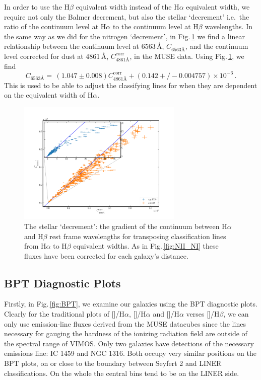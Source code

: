 		In order to use the H$\beta$ equivalent width instead of the H$\alpha$ equivalent width, we require not only the Balmer decrement, but also the stellar `decrement' i.e.\ the ratio of the continuum level at H$\alpha$ to the continuum level at H$\beta$ wavelengths. In the same way as we did for the nitrogen `decrement', in Fig.\,\ref{fig:stellarDec} we find a linear relationship between the continuum level at 6563\,\AA, $C_\text{6563\AA}$, and the continuum level corrected for dust at 4861\,\AA, $C^\text{corr}_\text{4861\AA}$, in the MUSE data. Using Fig.\,\ref{fig:stellarDec}, we find
		\begin{equation}
			C_\text{6563\AA} = \, (1.047\pm0.008) C^\text{corr}_\text{4861\AA} + (0.142+/-0.004757) \times 10^{-6} \, .
		\end{equation}
		This is used to be able to adjust the classifying lines for when they are dependent on the equivalent width of H$\alpha$. 

		\begin{figure}
			\centering
			\includegraphics[width=0.7\textwidth]{chapter5/stellar_ratio.png}
			\caption[The stellar `decrement']{The stellar `decrement': the gradient of the continuum between H$\alpha$ and H$\beta$ rest frame wavelengths for transposing classification lines from H$\alpha$ to H$\beta$ equivalent widths. As in Fig.\,\ref{fig:NII_NI} these fluxes have been corrected for each galaxy's distance.} 
			\label{fig:stellarDec}
		\end{figure}

	\subsection{BPT Diagnostic Plots}
		\label{subsec:BPT}
		Firstly, in Fig.\,\ref{fig:BPT}, we examine our galaxies using the BPT diagnostic plots. Clearly for the traditional plots of []/H$\alpha$, []/H$\alpha$ and []/H$\alpha$ verses []/H$\beta$, we can only use emission-line fluxes derived from the MUSE datacubes since the lines necessary for gauging the hardness of the ionizing radiation field are outside of the spectral range of VIMOS. Only two galaxies have detections of the necessary emissions line: IC 1459 and NGC 1316. Both occupy very similar positions on the BPT plots, on or close to the boundary between Seyfert 2 and LINER classifications. On the whole the central bins tend to be on the LINER side.

